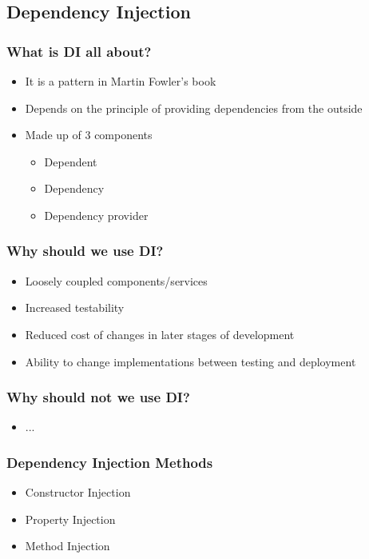 \documentclass[turkish]{beamer}
\begin{document}
	\subsection{Dependency Injection}
		\frame
		{
		  \frametitle{What is DI all about?}
		
		  \begin{itemize}
		  \item<1-> It is a pattern in Martin Fowler's book
		  \item<2-> Depends on the principle of providing dependencies from the outside
		  \item<3-> Made up of 3 components
			  \begin{itemize}
			  	\item<4->Dependent
			  	\item<5->Dependency
			  	\item<6->Dependency provider
			  \end{itemize}
		  \end{itemize}
		}
		\frame
		{
			\frametitle{Why should we use DI?}
		  \begin{itemize}
		  	\item<1->Loosely coupled components/services
		  	\item<2->Increased testability
		  	\item<3->Reduced cost of changes in later stages of development
		  	\item<4->Ability to change implementations between testing and deployment
		  \end{itemize}
		}
		\frame
		{
			\frametitle{Why should not we use DI?}
		  \begin{itemize}
		  	\item<1-> ...
		  \end{itemize}
		}
		\frame
		{
			\frametitle{Dependency Injection Methods}
		  \begin{itemize}
		  	\item<1->Constructor Injection
		  	\item<2->Property Injection
		  	\item<3->Method Injection
		  \end{itemize}
		}
		\frame
\end{document}
